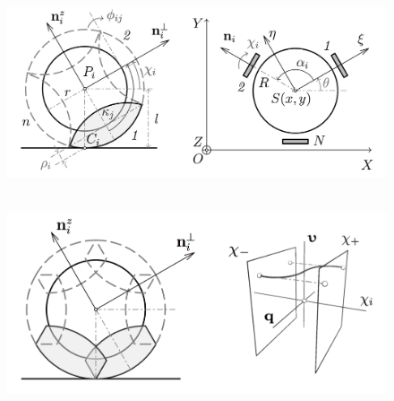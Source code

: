 \begin{figure}[H]
    \hspace{-15pt}
    \includegraphics[scale=0.25]{pic/pic_wheel_cart_300.png}
    \caption{\ }
    \label{fig:wheel}
\end{figure}

\begin{figure}[H]
    \hspace{25pt}
    \includegraphics[scale=0.25]{pic/pic_overlap_change_300.png}
    \caption{\ }
    \label{fig:overlap_and_change}
\end{figure}
